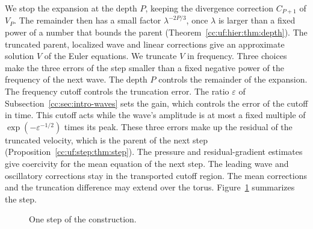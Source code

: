 We stop the expansion at the depth $P$, keeping the divergence
correction $C_{P+1}$ of $V_P$. The remainder then has a small factor
$\lambda^{-2P/3}$, once $\lambda$ is larger
than a fixed power of a number that bounds the parent
(Theorem~\ref{cc:uf:hier:thm:depth}). The truncated parent, localized wave
and linear corrections give an approximate solution $V$ of the Euler
equations. We truncate $V$ in frequency. Three choices make the three
errors of the step smaller than a fixed negative power of the frequency
of the next wave. The depth $P$ controls the remainder of the
expansion. The frequency cutoff controls the truncation error. The
ratio $\varepsilon$ of Subsection~\ref{cc:sec:intro-waves} sets the
gain, which controls the error of the cutoff in time. This cutoff acts
while the wave's amplitude is at most a fixed multiple of
$\exp(-\varepsilon^{-1/2})$ times its peak. These three errors make up
the residual of the truncated velocity, which is the parent of the next step
(Proposition~\ref{cc:uf:step:thm:step}).
The pressure and residual-gradient estimates give coercivity for
the mean equation of the next step. The leading wave and oscillatory
corrections stay in the transported cutoff region. The mean corrections
and the truncation difference may extend over the torus. Figure~\ref{cc:fig:correction-flow} summarizes the step.

\begin{figure}[tbp]
\centering
{}
\caption{One step of the construction.}
\label{cc:fig:correction-flow}
\end{figure}

